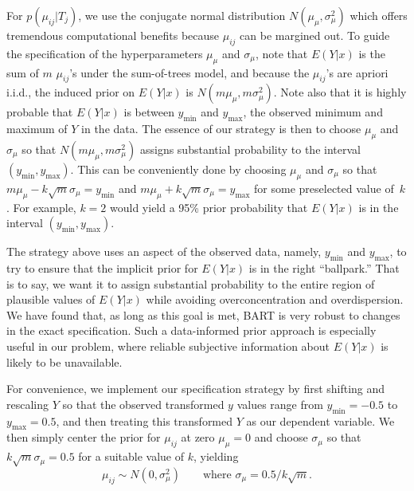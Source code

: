 \documentclass[aoas,nameyear,dvips]{arximspdf}
\begin{document}
For $p(\mu_{ij} | T_j)$, we use the conjugate normal distribution
$N(\mu_\mu, \sigma_\mu^2)$ which offers tremendous computational
benefits because $\mu_{ij}$ can be margined out.  To guide the
specification of the hyperparameters $\mu_\mu$ and $ \sigma_\mu$, note
that $E(Y | x)$ is the sum of $m$ $\mu_{ij}$'s under the sum-of-trees
model, and because the $\mu_{ij}$'s are apriori i.i.d., the induced
prior on $E(Y | x)$ is $N(m  \mu_\mu, m  \sigma_\mu^2)$. Note also that
it is highly probable that $E(Y | x)$ is between $y_{\min}$ and
$y_{\max}$, the observed minimum and maximum of $Y$ in the data. The
essence of our strategy is then to choose $\mu_\mu$ and $\sigma_\mu$ so
that $N(m   \mu_\mu, m  \sigma_\mu^2)$ assigns substantial probability
to the interval $(y_{\min}, y_{\max})$.  This can be conveniently done
by choosing $\mu_\mu$ and $ \sigma_\mu$ so that $m  \mu_\mu -  k
\sqrt{m}  \sigma_\mu = y_{\min}$ and $m   \mu_\mu +  k  \sqrt{m}
\sigma_\mu = y_{\max}$ for some preselected value of~$k$. For example,
$k=2$ would yield a 95\% prior probability that $E(Y | x)$ is in the
interval $(y_{\min}, y_{\max})$.

The strategy above uses an aspect of the observed data, namely, $y_{\min}$ and $y_{\max}$, to
try to ensure that the implicit prior for $E(Y | x)$ is in the right ``ballpark.''
That is to say, we want it to assign substantial probability to the entire region of
plausible values of $E(Y | x)$ while avoiding overconcentration and overdispersion.
We have found that, as long as this goal is met, BART is very robust to changes in the exact specification.
Such a data-informed prior approach is especially useful in our problem,  where reliable subjective information about $E(Y | x)$ is likely to be unavailable.


For convenience, we implement our specification strategy by first shifting and rescaling
$Y$ so that the observed transformed $y$ values range from  $y_{\min}= -0.5$ to $y_{\max}= 0.5$,
and then treating this transformed $Y$ as our dependent variable.
We then simply center the prior for $\mu_{ij}$ at zero $\mu_\mu
= 0$ and choose $\sigma_\mu$ so that
$ k \sqrt{m} \sigma_{\mu} = 0.5$ for
a suitable value of $k$,  yielding
\begin{equation}\label{eq:muprior}
\mu_{ij} \sim N(0,\sigma_{\mu}^2)\qquad \mbox{where     }
\sigma_{\mu} = 0.5/k \sqrt{m}.
\end{equation}
\end{document}
